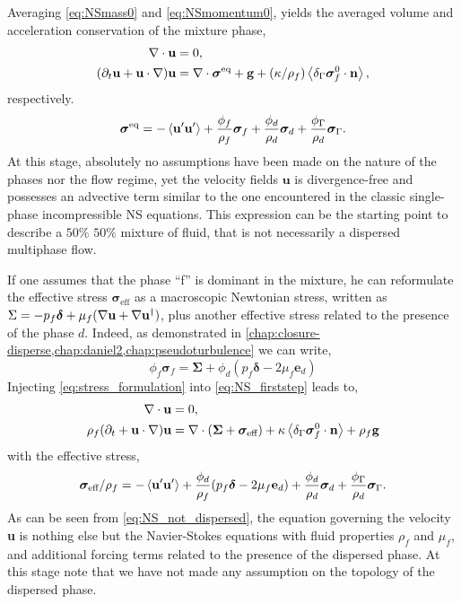 Averaging \ref{eq:NSmass0} and \ref{eq:NSmomentum0}, yields the averaged volume and acceleration conservation of the mixture phase, 
\begin{align}
    \div\textbf{u} &=0,\\
    (\pddt \textbf{u}  
    + \textbf{u} \cdot \grad )
    \textbf{u}
    &= 
    \div \bm{\sigma}^\text{eq} + 
    \textbf{g} 
    + (\kappa/\rho_f) \avg{\delta_\Gamma \bm{\sigma}_f^0 \cdot \textbf{n}},
    \label{eq:NS_firststep}
\end{align}
respectively. 
\begin{equation}
    \bm\sigma^\text{eq} = 
    - \left< \textbf{u}'\textbf{u}'\right>
    + \frac{\phi_f}{\rho_f}\bm\sigma_f
    + \frac{\phi_d}{\rho_d}\bm\sigma_d
    + \frac{\phi_\Gamma}{\rho_d} \bm\sigma_\Gamma. 
\end{equation}
At this stage, absolutely no assumptions have been made on the nature of the phases nor the flow regime, yet the velocity fields $\textbf{u}$ is divergence-free and possesses an advective term similar to the one encountered in the classic single-phase incompressible NS equations.
This expression can be the starting point to describe a $50\%$ $50\%$ mixture of fluid, that is not necessarily a dispersed multiphase flow. 

If one assumes that the phase ``f'' is dominant in the mixture, he can reformulate the effective stress $\bm\sigma_\text{eff}$ as a macroscopic Newtonian stress, written as $\Sigma = -  p_f \bm\delta  + \mu_f(\mathbf{\nabla} \textbf{u} + \mathbf{\nabla} \textbf{u}^\dagger)$, plus another effective stress related to the presence of the phase $d$.
Indeed, as demonstrated in \ref{chap:closure-disperse,chap:daniel2,chap:pseudoturbulence} we can write,
\begin{equation}
    \phi_f\bm\sigma_f
    = \bm\Sigma
    + \phi_d (p_f\bm\delta - 2\mu_f \textbf{e}_d)
    \label{eq:stress_formulation}
\end{equation}
Injecting \ref{eq:stress_formulation} into \ref{eq:NS_firststep} leads to, 
\begin{align}
    \label{eq:NS_not_dispersed_mass}
    \div\textbf{u}&=0, \\
    \rho_f (\pddt 
    + \textbf{u}\cdot \grad)
    \textbf{u}
    &= 
    \div( \bm\Sigma
    + \bm{\sigma}_\text{eff} )
    + \kappa \avg{\delta_\Gamma \bm{\sigma}_f^0 \cdot \textbf{n}} 
    + \rho_f \textbf{g} 
    \label{eq:NS_not_dispersed}
\end{align}
with the effective stress, 
\begin{equation}
    \bm\sigma_\text{eff} /\rho_f = 
    - \left< \textbf{u}'\textbf{u}'\right>
    + \frac{\phi_d}{\rho_f} (p_f\bm\delta - 2\mu_f \textbf{e}_d)
    + \frac{\phi_d}{\rho_d}\bm\sigma_d
    + \frac{\phi_\Gamma}{\rho_d} \bm\sigma_\Gamma. 
\end{equation}
As can be seen from \ref{eq:NS_not_dispersed}, the equation governing the velocity \textbf{u} is nothing else but the Navier-Stokes equations with fluid properties $\rho_f$ and $\mu_f$, and additional forcing terms related to the presence of the dispersed phase. 
At this stage note that we have not made any assumption on the topology of the dispersed phase. 

